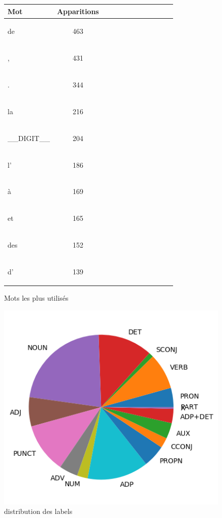 \begin{figure}[H] \begin{minipage}{0.48\textwidth} \centering \begin{tabular}{|l || *{11 }{|c} |} \hline
Mot & Apparitions  \\ \hline
\begin{verb} de \end{verb} &463\\ \hline
\begin{verb} , \end{verb} &431\\ \hline
\begin{verb} . \end{verb} &344\\ \hline
\begin{verb} la \end{verb} &216\\ \hline
\begin{verb} __DIGIT__ \end{verb} &204\\ \hline
\begin{verb} l' \end{verb} &186\\ \hline
\begin{verb} à \end{verb} &169\\ \hline
\begin{verb} et \end{verb} &165\\ \hline
\begin{verb} des \end{verb} &152\\ \hline
\begin{verb} d' \end{verb} &139\\ \hline

\end{tabular}
\caption{ Mots les plus utilisés } \label{Fig:muw}\end{minipage} 
\begin{minipage}{0.48\textwidth} \centering
\label{Fig:sequoiatest_img.png}
\caption{distribution des labels}\includegraphics[width=.7\linewidth]{sequoiatest_img.png}

\end{minipage}
\end{figure}



